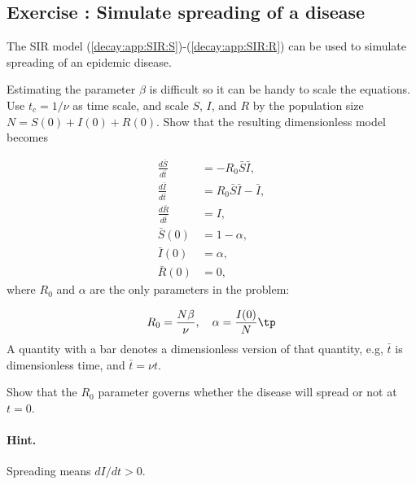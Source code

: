 \documentclass[graybox,sectrefs,envcountresetchap,open=right,final]{svmonodo}
\newenvironment{doconceexercise}{}{}
\newcounter{doconceexercisecounter}
\begin{document}
\begin{doconceexercise}

\subsection*{Exercise \thedoconceexercisecounter: Simulate spreading of a disease}

\label{decay:app:exer:SIR}

The SIR model (\ref{decay:app:SIR:S})-(\ref{decay:app:SIR:R}) can be used
to simulate spreading of an epidemic disease.


Estimating the parameter $\beta$
is difficult so it can be handy to scale the equations. Use
$t_c=1/\nu$ as time scale, and scale $S$, $I$, and $R$ by
the population size $N=S(0)+I(0)+R(0)$. Show that the resulting dimensionless
model becomes

\begin{align}
\frac{d\bar S}{d\bar t} &= - R_0\bar S\bar I,
\label{decay:app:SIR:S2}\\ 
\frac{d\bar I}{d\bar t} &= R_0 \bar S\bar I - \bar I,
\label{decay:app:SIR:I2}\\ 
\frac{d\bar R}{d\bar t} &= I,
\label{decay:SIR:R2}\\ 
\bar S(0) &= 1-\alpha,\\ 
\bar I(0) &= \alpha,\\ 
\bar R(0) &= 0,
\end{align}
where $R_0$ and $\alpha$ are the only parameters in the problem:

\[ R_0 = \frac{N\beta}{\nu}, \quad \alpha = \frac{I(0)}{N}\tp\]
A quantity with a bar denotes a dimensionless version of that quantity, e.g,
$\bar t$ is dimensionless time, and $\bar t = \nu t$.



Show that the $R_0$ parameter governs whether the disease will spread
or not at $t=0$.


\paragraph{Hint.}
Spreading means $dI/dt>0$.


\end{doconceexercise}
\end{document}
